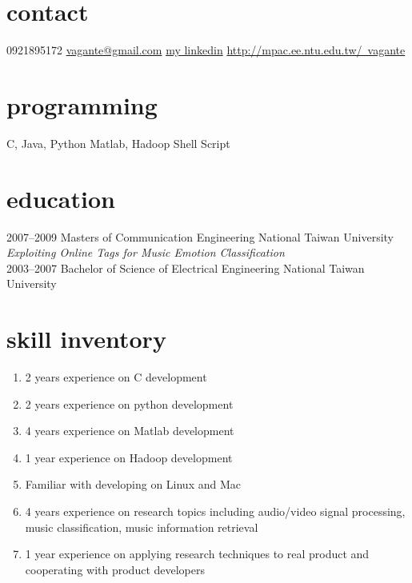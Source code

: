\documentclass{friggeri-cv}
\begin{document}

\begin{aside}
\section{contact}
	0921895172
    \href{mailto:vagante@gmail.com}{vagante@gmail.com}
    \href{http://tw.linkedin.com/pub/yu-ching-lin/43/737/913/}{my linkedin}
    \href{http://mpac.ee.ntu.edu.tw/~vagante}{http://mpac.ee.ntu.edu.tw/~vagante}

\section{programming}
    C, Java, Python
    Matlab, Hadoop
    Shell Script
\end{aside}

\section{education}
	\begin{entrylist}
    \entry
    {2007--2009}
    {Masters {\normalfont of Communication Engineering}}
    {National Taiwan University}
    {\emph{Exploiting Online Tags for Music Emotion Classification}} \\
    \entry
    {2003--2007}
    {Bachelor of Science {\normalfont of Electrical Engineering}}
    {National Taiwan University}
    \end{entrylist}

\section{skill inventory}
    \begin{enumerate}
        \item 2 years experience on C development
        \item 2 years experience on python development
        \item 4 years experience on Matlab development
        \item 1 year experience on Hadoop development
        \item Familiar with developing on Linux and Mac
        \item 4 years experience on research topics including audio/video signal
            processing, music classification, music information retrieval
        \item 1 year experience on applying research techniques to real product
            and cooperating with product developers
    \end{enumerate}
\end{document}
